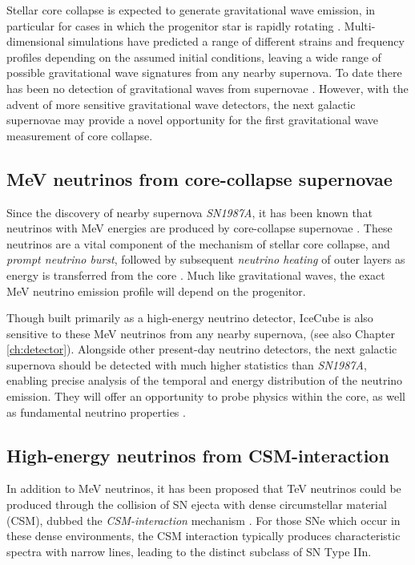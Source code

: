 Stellar core collapse is expected to generate gravitational wave emission, in particular for cases in which the  progenitor star is rapidly rotating . Multi-dimensional simulations have predicted a range of different strains and frequency profiles depending on the assumed initial conditions, leaving a wide range of possible gravitational wave signatures from any nearby supernova. To date there has been no detection of gravitational waves from supernovae . However, with the advent of more sensitive gravitational wave detectors, the next galactic supernovae may provide a novel opportunity for the first gravitational wave measurement of core collapse.

\subsection*{MeV neutrinos from core-collapse supernovae}

Since the discovery of nearby supernova \emph{SN1987A}, it has been known that neutrinos with MeV energies are produced by core-collapse supernovae . These neutrinos are a vital component of the mechanism of stellar core collapse, and \emph{prompt neutrino burst}, followed by subsequent \emph{neutrino heating} of outer layers as energy is transferred from the core . Much like gravitational waves, the exact MeV neutrino emission profile will depend on the progenitor.

Though built primarily as a high-energy neutrino detector, IceCube is also sensitive to these MeV neutrinos from any nearby supernova, (see also Chapter \ref{ch:detector}). Alongside other present-day neutrino detectors, the next galactic supernova should be detected with much higher statistics than \emph{SN1987A}, enabling precise analysis of the temporal and energy distribution of the neutrino emission. They will offer an opportunity to probe physics within the core, as well as fundamental neutrino properties \cite{sn_nu_review}.

\subsection*{High-energy neutrinos from CSM-interaction}

In addition to MeV neutrinos, it has been proposed that TeV neutrinos could be produced through the collision of SN ejecta with dense circumstellar material (CSM), dubbed the \emph{CSM-interaction} mechanism . For those SNe which occur in these dense environments, the CSM interaction typically produces characteristic spectra with narrow lines, leading to the distinct subclass of SN Type IIn. 


